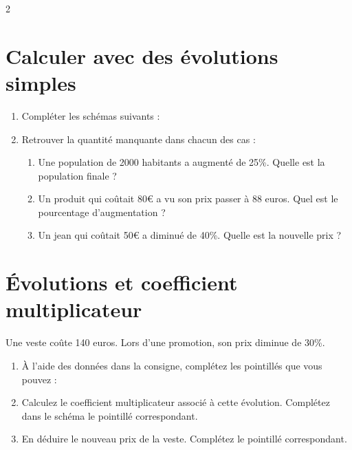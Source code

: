 \documentclass[10pt,a4paper]{article}
\begin{document}
\begin{multicols}{2}
\section{Calculer avec des évolutions simples}

\begin{exo}[][]
    \begin{enumerate}
        \item Compléter les schémas suivants :
        \item Retrouver la quantité manquante dans chacun des cas : \begin{enumerate}
            \item Une population de 2000 habitants a augmenté de 25\%. Quelle est la population finale ?
            \item Un produit qui coûtait 80€ a vu son prix passer à 88 euros. Quel est le pourcentage d'augmentation ?
            \item Un jean qui coûtait 50€ a diminué de 40\%. Quelle est la nouvelle prix ?
        \end{enumerate}
    \end{enumerate}
\end{exo}



\section{Évolutions et coefficient multiplicateur}

\begin{exo}
    Une veste coûte 140 euros. Lors d'une promotion, son prix diminue de 30\%.\begin{enumerate}
        \item À l'aide des données dans la consigne, complétez les pointillés que vous pouvez :
        \schemaevolution{\dots }{\dots}{-\dots }{ \times \dots}
        \item Calculez le coefficient multiplicateur associé à cette évolution. Complétez dans le schéma le pointillé correspondant.
        \item En déduire le nouveau prix de la veste. Complétez le pointillé correspondant.
    \end{enumerate}
\end{exo}


\end{multicols}
\end{document}
